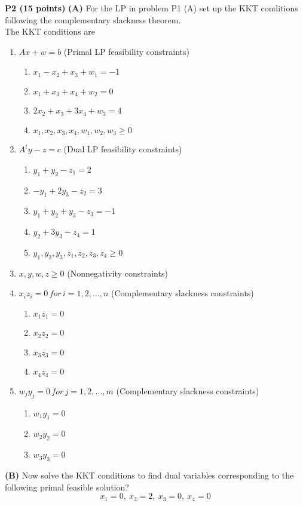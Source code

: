\documentclass[11pt]{article}
\begin{document}
\noindent\textbf{P2 (15 points) }  \textbf{(A)} For the LP in problem P1 (A) set up the KKT conditions
following the complementary slackness theorem.
\\
The KKT conditions are
\begin{enumerate}
  \item $Ax + w = b$ (Primal LP feasibility constraints)
  \begin{enumerate}
    \item $x_1 - x_2 + x_3 + w_1 = -1$
    \item $x_1 + x_3 + x_4 + w_2 = 0$
    \item $2x_2 + x_3 +3x_4 + w_3= 4$
    \item $x_1, x_2, x_3, x_4, w_1, w_2, w_3 \geq 0 $
  \end{enumerate}
  \item $A^{t}y - z = c$ (Dual LP feasibility constraints)
  \begin{enumerate}
    \item $y_1 + y_2 - z_1 = 2$
    \item $-y_1 + 2y_3 - z_2 = 3$
    \item $y_1 + y_2 + y_3 - z_3 = -1$
    \item $y_2 + 3y_3 -z_4 = 1$
    \item $y_1, y_2, y_3, z_1, z_2, z_3, z_4 \geq 0$
  \end{enumerate}
  \item $x, y, w, z \geq 0$ (Nonnegativity constraints)
  \item $x_iz_i = 0 \, for \, i = 1,2,\ldots,n$ (Complementary slackness constraints)
  \begin{enumerate}
    \item $x_1z_1 = 0$
    \item $x_2z_2 = 0$
    \item $x_3z_3 = 0$
    \item $x_4z_4 = 0$
  \end{enumerate}
  \item $w_jy_j = 0 \, for \, j = 1,2,\ldots,m$ (Complementary slackness constraints)
  \begin{enumerate}
    \item $w_1y_1 = 0$
    \item $w_2y_2 = 0$
    \item $w_3y_3 = 0$
  \end{enumerate}
\end{enumerate}

\noindent\textbf{(B)} Now solve the KKT conditions to find  dual
variables corresponding to  the following primal feasible solution?
\[ x_1 = 0,\ x_2 = 2,\ x_3 = 0,\ x_4 = 0 \]
\end{document}
